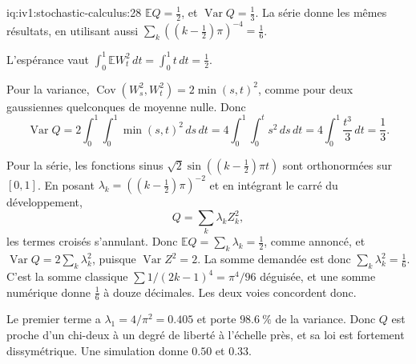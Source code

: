 \begin{solution}{iq:iv1:stochastic-calculus:28}
$\mathbb{E}Q = \frac12$, et $\operatorname{Var}Q = \frac13$. La série donne les mêmes résultats, en utilisant aussi $\sum_k((k - \frac12)\pi)^{-4} = \frac16$.

L'espérance vaut $\int_0^1\mathbb{E}W_t^2\,dt = \int_0^1t\,dt = \frac12$.

Pour la variance, $\operatorname{Cov}(W_s^2, W_t^2) = 2\min(s, t)^2$, comme pour deux gaussiennes quelconques de moyenne nulle. Donc
\[
\operatorname{Var}Q = 2\int_0^1\int_0^1\min(s, t)^2\,ds\,dt = 4\int_0^1\int_0^ts^2\,ds\,dt = 4\int_0^1\frac{t^3}{3}\,dt = \frac13.
\]

Pour la série, les fonctions sinus $\sqrt{2}\sin((k - \frac12)\pi t)$ sont orthonormées sur $[0, 1]$. En posant $\lambda_k = ((k - \frac12)\pi)^{-2}$ et en intégrant le carré du développement,
\[
Q = \sum_k\lambda_kZ_k^2,
\]
les termes croisés s'annulant. Donc $\mathbb{E}Q = \sum_k\lambda_k = \frac12$, comme annoncé, et $\operatorname{Var}Q = 2\sum_k\lambda_k^2$, puisque $\operatorname{Var}Z^2 = 2$. La somme demandée est donc $\sum_k\lambda_k^2 = \frac16$. C'est la somme classique $\sum 1/(2k - 1)^4 = \pi^4/96$ déguisée, et une somme numérique donne $\frac16$ à douze décimales. Les deux voies concordent donc.

Le premier terme a $\lambda_1 = 4/\pi^2 = 0.405$ et porte $98.6~\%$ de la variance. Donc $Q$ est proche d'un chi-deux à un degré de liberté à l'échelle près, et sa loi est fortement dissymétrique. Une simulation donne $0.50$ et $0.33$.



\end{solution}

